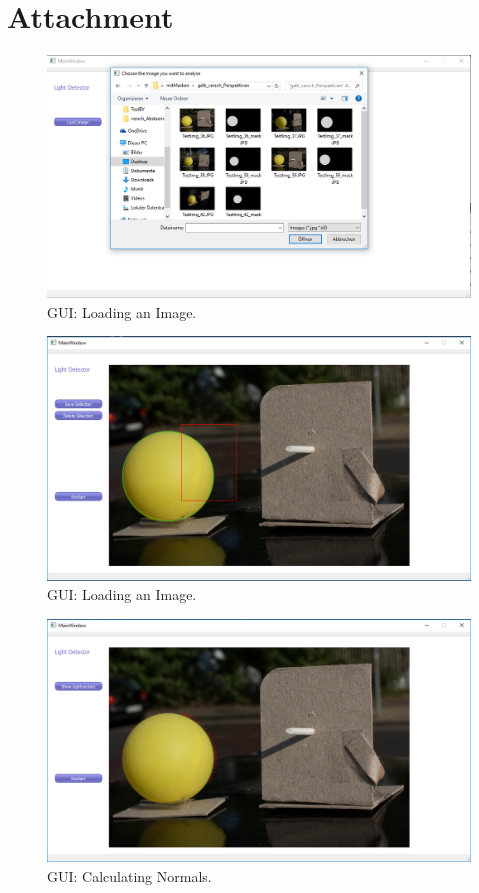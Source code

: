 \section{Attachment} \label{sec:Attachment}

\begin{figure} [H]
	\center 
	\includegraphics[width=15cm]{Images/01Gui.PNG}			
	\caption[GUI: Loading an Image.]{GUI: Loading an Image.}
	\label{fig:Gui01}
\end{figure}
\begin{figure} [H]
	\center 
	\includegraphics[width=15cm]{Images/03Gui.PNG}			
	\caption[GUI: Selecting a Contour.]{GUI: Loading an Image.}
	\label{fig:Gui02}
\end{figure}
\begin{figure} [H]
	\center 
	\includegraphics[width=15cm]{Images/05Gui.PNG}			
	\caption[GUI: Calculating Normals.]{GUI: Calculating Normals.}
	\label{fig:Gui03}
\end{figure}
